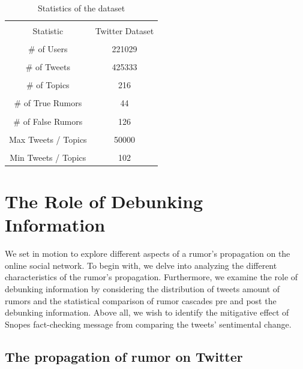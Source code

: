 \documentclass[conference]{IEEEtran}
\begin{document}
	
	\begin{table}[htbp]
		\caption{Statistics of the dataset}
		\begin{center}
			\begin{tabular}{|c|c|}
				\hline \\[-1em]
				Statistic           & Twitter Dataset \\
				\hline
				\\[-1em]
				\# of Users         & 221029          \\
				\hline
				\\[-1em]
				\# of Tweets        & 425333          \\
				\hline
				\\[-1em]
				\# of Topics        & 216             \\
				\hline
				\\[-1em]
				\# of True Rumors   & 44              \\
				\hline	
				\\[-1em]		
				\# of False Rumors  & 126             \\
				\hline	
				\\[-1em]		
				Max Tweets / Topics & 50000           \\
				\hline	
				\\[-1em]		
				Min Tweets / Topics & 102               \\
				\hline
			\end{tabular}
			\label{table: datasets}
		\end{center}
	\end{table}
	
	
	\section{The Role of Debunking Information}
	We set in motion to explore different aspects of a rumor's propagation on the online social network. To begin with, we delve into analyzing the different characteristics of the rumor's propagation. Furthermore, we examine the role of debunking information by considering the distribution of tweets amount of rumors and the statistical comparison of rumor cascades pre and post the debunking information. Above all, we wish to identify the mitigative effect of Snopes fact-checking message from comparing the tweets' sentimental change. 
	
	\subsection{The propagation of rumor on Twitter}
	
\end{document}
